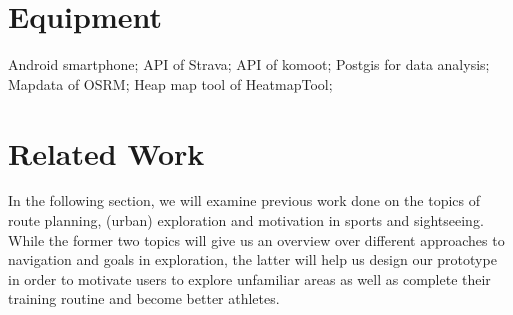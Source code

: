 \documentclass{sigchi}
\begin{document}
\section{Equipment}
Android smartphone;
API of Strava;
API of komoot;
Postgis for data analysis;
Mapdata of OSRM;
Heap map tool of HeatmapTool;


\section{Related Work}
In the following section, we will examine previous work done on the topics of route planning, (urban) exploration and motivation in sports and sightseeing. While the former two topics will give us an overview over different approaches to navigation and goals in exploration, the latter will help us design our prototype in order to motivate users to explore unfamiliar areas as well as complete their training routine and become better athletes.
\end{document}
